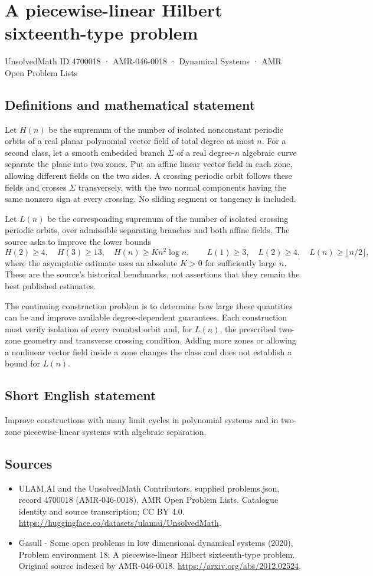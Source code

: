 \documentclass[11pt,a4paper]{article}
\begin{document}
\section*{A piecewise-linear Hilbert sixteenth-type problem}\label{4700018}
{\small UnsolvedMath ID 4700018 · AMR-046-0018 · Dynamical Systems · AMR Open Problem Lists}
\subsection{Definitions and mathematical statement}
Let $H(n)$ be the supremum of the number of isolated nonconstant periodic
orbits of a real planar polynomial vector field of total degree at most $n$.
For a second class, let a smooth embedded branch $\Sigma$ of a real
degree-$n$ algebraic curve separate the plane into two zones. Put an affine
linear vector field in each zone, allowing different fields on the two
sides. A crossing periodic orbit follows these fields and crosses $\Sigma$
transversely, with the two normal components having the same nonzero sign
at every crossing. No sliding segment or tangency is included.

Let $L(n)$ be the corresponding supremum of the number of isolated
crossing periodic orbits, over admissible separating branches and both
affine fields. The source asks to improve the lower bounds
\[
 H(2)\ge4,\quad H(3)\ge13,\quad H(n)\ge K n^2\log n,
 \qquad
 L(1)\ge3,\quad L(2)\ge4,\quad L(n)\ge\lfloor n/2\rfloor,
\]
where the asymptotic estimate uses an absolute $K>0$ for sufficiently large
$n$. These are the source's historical benchmarks, not assertions that
they remain the best published estimates.

The continuing construction problem is to determine how large these
quantities can be and improve available degree-dependent guarantees.
Each construction must verify isolation of every counted orbit and, for
$L(n)$, the prescribed two-zone geometry and transverse crossing condition.
Adding more zones or allowing a nonlinear vector field inside a zone
changes the class and does not establish a bound for $L(n)$.
\subsection{Short English statement}
Improve constructions with many limit cycles in polynomial systems and in two-zone piecewise-linear systems with algebraic separation.
\subsection{Sources}
\begin{itemize}
\item[S1] ULAM.AI and the UnsolvedMath Contributors, supplied problems.json, record 4700018 (AMR-046-0018), AMR Open Problem Lists. Catalogue identity and source transcription; CC BY 4.0.
\url{https://huggingface.co/datasets/ulamai/UnsolvedMath}.
\item[S2] Gasull - Some open problems in low dimensional dynamical systems (2020), Problem environment 18: A piecewise-linear Hilbert sixteenth-type problem. Original source indexed by AMR-046-0018.
\url{https://arxiv.org/abs/2012.02524}.
\end{itemize}
\end{document}

